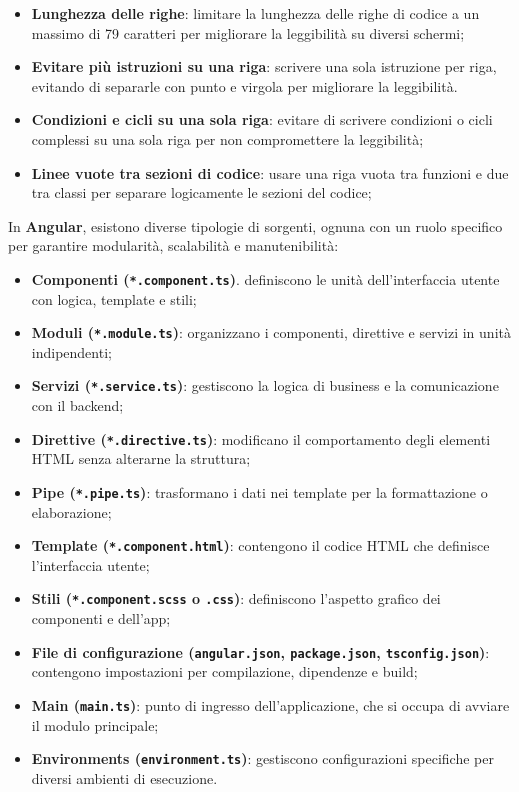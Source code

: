 \begin{itemize}
    \item \textbf{Lunghezza delle righe}: limitare la lunghezza delle righe di codice a un massimo di 79 caratteri per migliorare la leggibilità su diversi schermi;
    \item \textbf{Evitare più istruzioni su una riga}: scrivere una sola istruzione per riga, evitando di separarle con punto e virgola per migliorare la leggibilità.
    \item \textbf{Condizioni e cicli su una sola riga}: evitare di scrivere condizioni o cicli complessi su una sola riga per non compromettere la leggibilità;
    \item \textbf{Linee vuote tra sezioni di codice}: usare una riga vuota tra funzioni e due tra classi per separare logicamente le sezioni del codice;
\end{itemize}

In \textbf{Angular}, esistono diverse tipologie di sorgenti, ognuna con un ruolo specifico per garantire modularità, scalabilità e manutenibilità:
\begin{itemize}
    \item \textbf{Componenti (\texttt{*.component.ts})}. definiscono le unità dell’interfaccia utente con logica, template e stili;
    \item \textbf{Moduli (\texttt{*.module.ts})}: organizzano i componenti, direttive e servizi in unità indipendenti;
    \item \textbf{Servizi (\texttt{*.service.ts})}: gestiscono la logica di business e la comunicazione con il backend;
    \item \textbf{Direttive (\texttt{*.directive.ts})}: modificano il comportamento degli elementi HTML senza alterarne la struttura;
    \item \textbf{Pipe (\texttt{*.pipe.ts})}: trasformano i dati nei template per la formattazione o elaborazione;
    \item \textbf{Template (\texttt{*.component.html})}: contengono il codice HTML che definisce l’interfaccia utente;
    \item \textbf{Stili (\texttt{*.component.scss} o \texttt{.css})}: definiscono l’aspetto grafico dei componenti e dell’app;
    \item \textbf{File di configurazione (\texttt{angular.json}, \texttt{package.json}, \texttt{tsconfig.json})}: contengono impostazioni per compilazione, dipendenze e build;
    \item \textbf{Main (\texttt{main.ts})}: punto di ingresso dell’applicazione, che si occupa di avviare il modulo principale;
    \item \textbf{Environments (\texttt{environment.ts})}: gestiscono configurazioni specifiche per diversi ambienti di esecuzione.  
\end{itemize}

